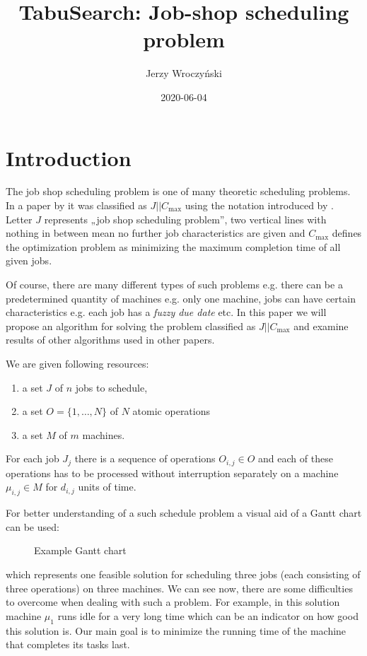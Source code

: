 \documentclass[14pt]{article}
\title{TabuSearch: Job-shop scheduling problem}
\author{Jerzy Wroczyński}
\date{2020-06-04}
\begin{document}
\maketitle

\section{Introduction}

The job shop scheduling problem is one of many theoretic scheduling problems. In a paper by \citet{amico-trubian} it was classified as $J || C_{\max}$ using the notation introduced by \citet{graham}. Letter $J$ represents „job shop scheduling problem”, two vertical lines with nothing in between mean no further job characteristics are given and $C_{\max}$ defines the optimization problem as minimizing the maximum completion time of all given jobs.

Of course, there are many different types of such problems e.g. there can be a predetermined quantity of machines e.g. only one machine, jobs can have certain characteristics e.g. each job has a \textit{fuzzy due date} etc. In this paper we will propose an algorithm for solving the problem classified as $J || C_{\max}$ and examine results of other algorithms used in other papers.

\hspace{2pt}

We are given following resources:
\begin{enumerate}
  \item a set $J$ of $n$ jobs to schedule,
  \item a set $O = \{1,\dots,N\}$ of $N$ atomic operations
  \item a set $M$ of $m$ machines.
\end{enumerate}

For each job $J_j$ there is a sequence of operations $O_{i,j} \in O$ and each of these operations has to be processed without interruption separately on a machine $\mu_{i,j} \in M$ for $d_{i,j}$ units of time.

For better understanding of a such schedule problem a visual aid of a Gantt chart can be used:
\begin{figure}[H]
  \centering
  \def\svgwidth{0.5\columnwidth}
  
  \caption{Example Gantt chart}
  \label{example-gantt}
\end{figure}
which represents one feasible solution for scheduling three jobs (each consisting of three operations) on three machines. We can see now, there are some difficulties to overcome when dealing with such a problem. For example, in this solution machine $\mu_1$ runs idle for a very long time which can be an indicator on how good this solution is. Our main goal is to minimize the running time of the machine that completes its tasks last.
\end{document}
